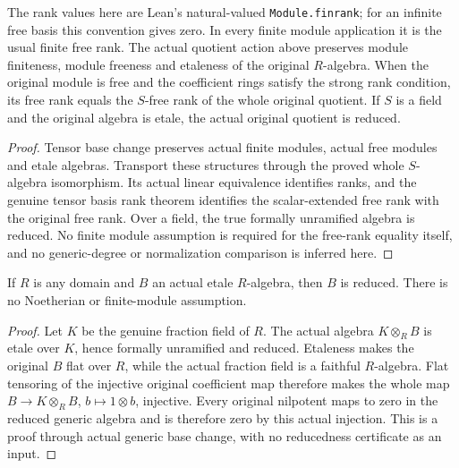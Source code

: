 \begin{theorem}
\label{algebra:surjective-base-change-free-etale}
\leanok
{}
The rank values here are Lean's natural-valued \texttt{Module.finrank};
for an infinite free basis this convention gives zero. In every finite
module application it is the usual finite free rank.
The actual quotient action above preserves module finiteness, module
freeness and etaleness of the original $R$-algebra. When the original
module is free and the coefficient rings satisfy the strong rank
condition, its free rank equals the $S$-free rank of the whole original
quotient. If $S$ is a field and the original algebra is etale, the
actual original quotient is reduced.
\end{theorem}
\begin{proof}
Tensor base change preserves actual finite modules, actual free
modules and etale algebras. Transport these structures through the
proved whole $S$-algebra isomorphism. Its actual linear equivalence
identifies ranks, and the genuine tensor basis rank theorem identifies
the scalar-extended free rank with the original free rank. Over a
field, the true formally unramified algebra is reduced. No finite
module assumption is required for the free-rank equality itself, and
no generic-degree or normalization comparison is inferred here.
\end{proof}

\begin{theorem}
\label{algebra:etale-domain-generic-reduced}
\leanok
If $R$ is any domain and $B$ an actual etale $R$-algebra, then $B$ is
reduced. There is no Noetherian or finite-module assumption.
\end{theorem}
\begin{proof}
Let $K$ be the genuine fraction field of $R$. The actual algebra
$K\otimes_R B$ is etale over $K$, hence formally unramified and
reduced. Etaleness makes the original $B$ flat over $R$, while the
actual fraction field is a faithful $R$-algebra. Flat tensoring of the
injective original coefficient map therefore makes the whole map
$B\to K\otimes_R B$, $b\mapsto1\otimes b$, injective. Every original
nilpotent maps to zero in the reduced generic algebra and is therefore
zero by this actual injection. This is a proof through actual generic
base change, with no reducedness certificate as an input.
\end{proof}

